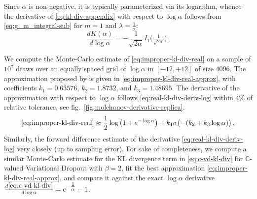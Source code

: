 \documentclass{article}
\newcommand{\cplx}{\mathbb{C}}
\begin{document}
Since $\alpha$ is non-negative, it is typically parameterized via its logarithm, whence
the derivative of \eqref{eq:kl-div-appendix} with respect to $\log\alpha$ follows from
\eqref{eq:g_m_integral-sub} for $m=1$ and $\lambda = \tfrac1\alpha$:
\begin{equation}  \label{eq:real-kl-div-deriv-log}
  \frac{d K(\alpha)}{d\log \alpha}
    = - \frac1{\sqrt{2\alpha}} I_1\bigl(\tfrac1{\sqrt{2\alpha}}\bigr)
    \,.
\end{equation}

We compute the Monte-Carlo estimate of \eqref{eq:improper-kl-div-real} on a sample
of $10^7$ draws over an equally spaced grid of $\log \alpha$ in $[-12, +12]$ of size
$4096$. The approximation proposed by \citet{molchanov_variational_2017} is given in
\eqref{eq:improper-kl-div-real-approx}, with coefficients $
  k_1 = 0.63576
$, $
  k_2 = 1.8732
$, and $
  k_3 = 1.48695
$. The derivative of the approximation with respect to $\log \alpha$ follows
\eqref{eq:real-kl-div-deriv-log} within $4\%$ of relative tolerance, see
fig.~\ref{fig:molchanov-derivative-replica}. 
\begin{equation}  \label{eq:improper-kl-div-real-approx}
  \eqref{eq:improper-kl-div-real}
  \approx
    \frac12 \log{\bigl(1 + e^{-\log \alpha}\bigr)}
    + k_1 \sigma\bigl(- (k_2 + k_3 \log \alpha)\bigr)
  \,,
\end{equation}
Similarly, the forward difference estimate of the derivative \eqref{eq:real-kl-div-deriv-log}
very closely (up to sampling error). For sake of completeness, we compute a similar
Monte-Carlo estimate for the KL divergence term in \eqref{eq:c-vd-kl-div} for $\cplx$-valued
Variational Dropout with $\beta = 2$, fit the best approximation \eqref{eq:improper-kl-div-real-approx},
and compare it against the exact $\log \alpha$ derivative $
  \frac{d \eqref{eq:c-vd-kl-div}}{d\log \alpha}
    = e^{-\tfrac1\alpha} - 1
$.
\end{document}
